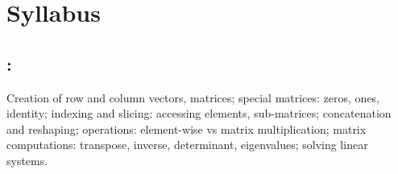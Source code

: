\section*{Syllabus}

    \subsection*{\topicSubTitle: \topicTitle}
        Creation of row and column vectors, matrices; special matrices: zeros, ones, identity; indexing and slicing: accessing elements, sub-matrices; concatenation and reshaping; operations: element-wise vs matrix multiplication; matrix computations: transpose, inverse, determinant, eigenvalues; solving linear systems.